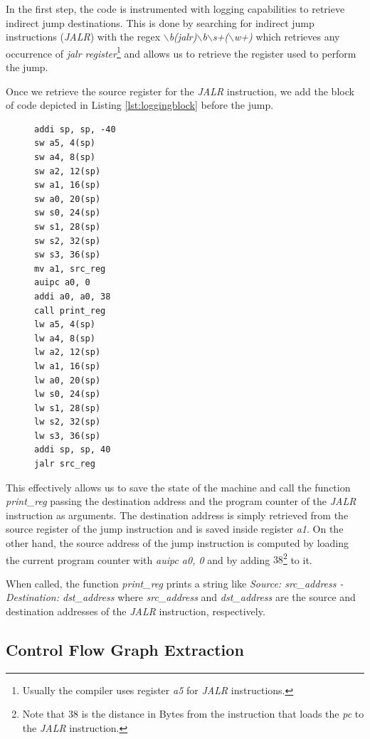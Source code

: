 In the first step, the code is instrumented with logging capabilities to
retrieve indirect jump destinations. This is done by searching for indirect jump
instructions (\textit{JALR}) with the regex \textit{$\backslash$b(jalr)$\backslash$b$\backslash$s+($\backslash$w+)}
which retrieves any occurrence of \textit{jalr register}\footnote{Usually the
compiler uses register \textit{a5} for \textit{JALR} instructions.} and allows us
to retrieve the register used to perform the jump.

Once we retrieve the source register for the \textit{JALR} instruction, we add the
block of code depicted in Listing \ref{lst:loggingblock} before the jump.

\begin{figure}
  \setlength{\intextsep}{0pt}
  \begin{minipage}{0.25\textwidth}
    \begin{lstlisting}[style=Assembly, caption = Logging code block, label={lst:loggingblock}]
addi sp, sp, -40
sw a5, 4(sp)
sw a4, 8(sp)
sw a2, 12(sp)
sw a1, 16(sp)
sw a0, 20(sp)
sw s0, 24(sp)
sw s1, 28(sp)
sw s2, 32(sp)
sw s3, 36(sp)
mv a1, src_reg
auipc a0, 0
addi a0, a0, 38
call print_reg
lw a5, 4(sp)
lw a4, 8(sp)
lw a2, 12(sp)
lw a1, 16(sp)
lw a0, 20(sp)
lw s0, 24(sp)
lw s1, 28(sp)
lw s2, 32(sp)
lw s3, 36(sp)
addi sp, sp, 40
jalr src_reg
 \end{lstlisting}
  \end{minipage}
\end{figure}

This effectively allows us to save the state of the machine and call the
function \textit{print\_reg} passing the destination address and the program counter
of the \textit{JALR} instruction as arguments. The destination address is simply
retrieved from the source register of the jump instruction and is saved inside register
\textit{a1}. On the other hand, the source address of the jump instruction is
computed by loading the current program counter with \textit{auipc a0, 0} and by
adding $38$\footnote{Note that $38$ is the distance in Bytes from the
instruction that loads the \textit{pc} to the \textit{JALR} instruction.} to it.

When called, the function \textit{print\_reg} prints a string like \textit{Source:
src\_address - Destination: dst\_address} where \textit{src\_address} and
\textit{dst\_address} are the source and destination addresses of the \textit{JALR}
instruction, respectively.

\subsection{Control Flow Graph Extraction}
\label{subsec:project_cfgextraction}

